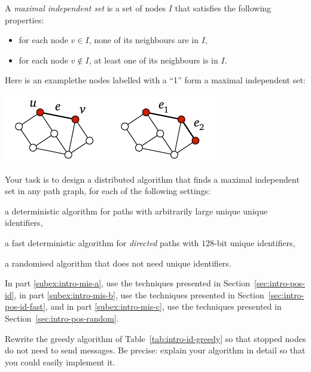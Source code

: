 \begin{ex}\label{ex:intro-mis}
    A \emph{maximal independent set} is a set of nodes $I$ that satisfies the following properties:
    \begin{itemize}[noitemsep]
        \item for each node $v \in I$, none of its neighbours are in $I$,
        \item for each node $v \notin I$, at least one of its neighbours is in $I$.
    \end{itemize}
    Here is an example\mydash the nodes labelled with a ``1'' form a maximal independent set:
    \begin{center}
        \includegraphics[page=\PIntroMis]{figs.pdf}
    \end{center}
    Your task is to design a distributed algorithm that finds a maximal independent set in any path graph, for each of the following settings:
    \begin{subex}
        \item\label{subex:intro-mis-a} a deterministic algorithm for paths with arbitrarily large unique unique identifiers,
        \item\label{subex:intro-mis-b} a fast deterministic algorithm for \emph{directed} paths with $128$-bit unique identifiers,
        \item\label{subex:intro-mis-c} a randomised algorithm that does not need unique identifiers. 
    \end{subex}
    In part \ref{subex:intro-mis-a}, use the techniques presented in Section~\ref{sec:intro-pos-id},
    in part \ref{subex:intro-mis-b}, use the techniques presented in Section~\ref{sec:intro-pos-id-fast}, and
    in part \ref{subex:intro-mis-c}, use the techniques presented in Section~\ref{sec:intro-pos-random}.
\end{ex}

\begin{ex}\label{ex:intro-stopped}
    Rewrite the greedy algorithm of Table~\ref{tab:intro-id-greedy} so that stopped nodes do not need to send messages. Be precise: explain your algorithm in detail so that you could easily implement it.
\end{ex}

